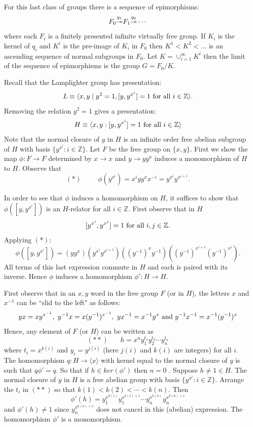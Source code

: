 \documentclass[12pt]{article}
\begin{document}
For this last class of groups there is a sequence of epimorphisms: 
$$F_0{\buildrel q_1\over  \twoheadrightarrow} F_1 {\buildrel q_2 \over \twoheadrightarrow}\cdots $$
where each $F_i$ is a finitely presented infinite virtually free group. If $K_i$ is the kernel of $q_i$ and $K^i$ is the pre-image of $K_i$ in $F_0$ then $K^1<K^2<\ldots$ is an ascending sequence of normal subgroups in $F_0$. Let $K=\cup_{i=1}^\infty K^i$ then the limit of the sequence of epimorphisms is  the group $G=F_0/K$. 

\medskip

 Recall that the Lamplighter group has presentation:
$$L\equiv \langle x,y\mid y^2=1, [y,y^{x^i}]=1 \hbox{ for all } i\in \mathbb Z\rangle .$$
Removing the relation $y^2=1$ gives a presentation:
$$H\equiv \langle x,y: [y,y^{x^i}]=1 \hbox{ for all } i\in \mathbb Z\rangle$$
Note that the normal closure of $y$ in $H$ is an infinite order free abelian subgroup of $H$ with basis $\{y^{x^i}:i\in \mathbb Z\}$. 
Let $F$ be the free group on $\{x,y\}$. First we show the map $\phi:F\to F$ determined by $x\to x$ and $y\to yy^x$ induces a monomorphism of $H$ to $H$. Observe that 
$$(\ast)\ \ \ \ \ \ \ \ \ \ \ \phi(y^{x^i})=x^iyy^xx^{-i}=y^{x^i}y^{x^{i+1}}.$$


In order to see that $\phi$ induces a homomorphism on $H$, it suffices to show that $\phi([y,y^{x^i}])$ is an $H$-relator for all $i\in \mathbb Z$.  First observe that in $H$
$$[y^{x^i},y^{x^j}]=1 \hbox{ for all } i,j\in \mathbb Z.$$
Applying $(\ast)$:
$$\phi([ y, y^{x^i}])=(yy^x)( y^{x^i} y^{x^{i+1}})( (y^{-1})^x y^{-1})  ((y^{-1})^{x^{i+1}}(y^{-1})^{x^i}).$$
All terms of this last expression commute in $H$ and each is paired with its inverse. Hence $\phi$ induces a homomorphism  $\phi':H\to H$.

First observe that in an $x,y$ word in the free group $F$ (or in $H$), the letters $x$ and $x^{-1}$ can be ``slid to the left" as follows:
$$yx=xy^{x^{-1}},\  y^{-1}x=x(y^{-1})^{x^{-1}},\  yx^{-1} =x^{-1}y^x\hbox{ and }y^{-1}x^{-1}=x^{-1}(y^{-1})^x$$ 
Hence, any element of $F$ (or $H$) can be written as 
$$(\ast\ast)\ \ \ \ \ \ \ \ h=x^ny_1^{t_1}y_2^{t_2}\cdots y_n^{t_n}$$
where $t_i=x^{k(i)}$ and $y_i=y^{j(i)}$ (here $j(i)$ and $k(i)$ are integers) for all $i$. The homomorphism $q:H \to \mathbb \langle x\rangle$ with kernel equal to the normal closure of $y$ is such that $q\phi'=q$. So that if $h\in ker(\phi')$ then $n=0$ .  Suppose $h\ne 1\in H$. The normal closure of $y$ in $H$ is a free abelian group with basis $\{y^{x^i}: i\in \mathbb Z\}$. Arrange the $t_i$ in $(\ast\ast )$ so that $k(1)<k(2)<\cdots <k(n)$. Then 
$$\phi'(h)= y_1^{x^{k(1)}}y_1^{x^{k(1)+1}}\cdots y_n^{x^{k(n)}}y_n^{x^{k(n)+1}}$$
and $\phi'(h)\ne 1$ since $y_n^{x^{k(n)+1}}$ does not cancel in this (abelian) expression. The homomorphism $\phi'$ is a monomorphism. 
\end{document}
